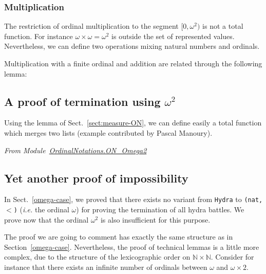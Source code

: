 

\subsubsection{Multiplication}

The restriction of ordinal multiplication to the segment $[0,\omega^2)$ is not a total function.
For instance $\omega\times\omega= \omega^2$ is outside the set of represented values.
Nevertheless, we can define two operations mixing natural numbers and ordinals.





Multiplication with a finite ordinal and addition are related through the following lemma:

 

\subsection{A proof of termination using \texorpdfstring{$\omega^2$}{omega^2}} 
\label{sect:merge-example}

Using the lemma of Sect.~\vref{sect:measure-ON}, we can define easily a total function which merges two lists (example contributed by Pascal Manoury).


\vspace{4pt}
\noindent\emph{From Module~\href{../theories/html/hydras.OrdinalNotations.ON_Omega2.html}{OrdinalNotations.ON\_Omega2}}


 

\subsection{Yet another  proof of impossibility}
\label{omega2-case}

In Sect.~\vref{omega-case}, we proved that there exists no variant from \texttt{Hydra} to \texttt{(nat,$<$)}
(\emph{i.e.} the ordinal $\omega$) for proving the termination of all hydra battles.
We  prove now that  the ordinal $\omega^2$ is also insufficient for this purpose. 

The proof we are going to comment has exactly the same structure as in Section~\ref{omega-case}.
 Nevertheless, the proof of technical  lemmas is a little more complex, due to 
 the structure of the lexicographic order on $\mathbb{N}\times\mathbb{N}$. 
Consider for instance that there exists an infinite number of ordinals  between
$\omega$ and $\omega\times 2$.



